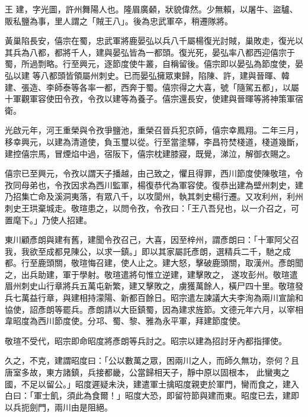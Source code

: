 
\begin{pinyinscope}

 王
 建，字光圖，許州舞陽人也。隆眉廣顙，狀貌偉然。少無賴，以屠牛、盜驢、販私鹽為事，里人謂之「賊王八」。後為忠武軍卒，稍遷隊將。



 黃巢陷長安，僖宗在蜀，忠武軍將鹿晏弘以兵八千屬楊復光討賊，巢敗走，復光以其兵為八都，都將千人，建與晏弘皆為一都頭。復光死，晏弘率八都西迎僖宗于蜀，所過剽略。行至興元，逐節度使牛叢，自稱留後。僖宗即以晏弘為節度使，晏弘以建
 等八都頭皆領屬州刺史。已而晏弘擁眾東歸，陷陳、許，建與晉暉、韓建、張造、李師泰等各率一都，西奔于蜀。僖宗得之大喜，號「隨駕五都」，以屬十軍觀軍容使田令孜，令孜以建等為養子。僖宗還長安，使建與晉暉等將神策軍宿衛。



 光啟元年，河王重榮與令孜爭鹽池，重榮召晉兵犯京師，僖宗幸鳳翔。二年三月，移幸興元，以建為清道使，負玉璽以從。行至當塗驛，李昌符焚棧道，棧道幾斷，建控僖宗馬，冒煙焰中過，宿阪下，僖宗枕建膝寢，既覺，涕泣，解御衣賜之。



 僖宗已至興元，令孜以謂天子播越，由己致之，懼且得罪，西川節度使陳敬瑄，令
 孜同母弟也，令孜因求為西川監軍，楊復恭代為軍容使。復恭出建為壁州刺史，建乃招集亡命及溪洞夷落，有眾八千，以攻閬州，執其刺史楊行遷。又攻利州，利州刺史王珙棄城走。敬瑄患之，以問令孜，令孜曰：「王八吾兒也，以一介召之，可置麾下。」乃使人招建。



 東川顧彥朗與建有舊，建聞令孜召己，大喜，因至梓州，謂彥朗曰：「十軍阿父召我，我欲至成都見陳公，以求一鎮。」即以其家屬託彥朗，選精兵二千，馳之成都。行至鹿頭關，敬瑄悔召建，使人止之。建大怒，擊破鹿頭關，取漢州。彥朗聞之，出兵助建，軍于學射。敬瑄遣將句惟立逆建，建擊敗之，
 遂攻彭州。敬瑄遣眉州刺史山行章將兵五萬屯新繁，建又擊敗之，虜獲萬餘人，橫尸四十里。敬瑄發兵七萬益行章，與建相持濛陽、新都百餘日。昭宗遣左諫議大夫李洵為兩川宣諭和協使，詔彥朗等罷兵。彥朗請以大臣鎮蜀，因為建求旌節。文德元年六月，以宰相韋昭度為西川節度使。分邛、蜀、黎、雅為永平軍，拜建節度使。



 敬瑄不受代，昭宗即命昭度將彥朗等兵討之。昭宗以建為招討牙內都指揮使。



 久之，不克，建謂昭度曰：「公以數萬之眾，困兩川之人，而師久無功，奈何？且唐室多故，東方諸鎮，兵接都畿，公當歸相天子，靜中原以固根本，
 此蠻夷之國，不足以留公。」昭度遲疑未決，建遣軍士擒昭度親吏於軍門，臠而食之，建入白曰：「軍士飢，須此為食爾！」昭度大恐，即留符節與建而東。昭度已去，建即以兵扼劍門，兩川由是阻絕。




\end{pinyinscope}
